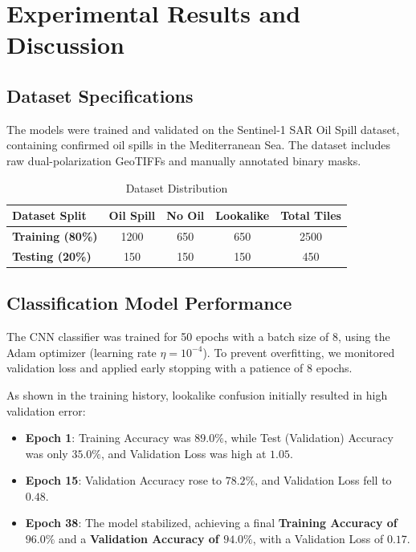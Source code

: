 \documentclass[conference]{IEEEtran}
\begin{document}
\section{Experimental Results and Discussion}

\subsection{Dataset Specifications}
The models were trained and validated on the Sentinel-1 SAR Oil Spill dataset, containing confirmed oil spills in the Mediterranean Sea. The dataset includes raw dual-polarization GeoTIFFs and manually annotated binary masks.

\begin{table}[h]
\caption{Dataset Distribution}
\label{tab:dataset}
\centering
\begin{tabular}{lcccc}
\toprule
Dataset Split & Oil Spill & No Oil & Lookalike & Total Tiles \\
\midrule
\textbf{Training (80\%)} & 1200 & 650 & 650 & 2500 \\
\textbf{Testing (20\%)} & 150 & 150 & 150 & 450 \\
\bottomrule
\end{tabular}
\end{table}

\subsection{Classification Model Performance}
The CNN classifier was trained for 50 epochs with a batch size of 8, using the Adam optimizer (learning rate $\eta = 10^{-4}$). To prevent overfitting, we monitored validation loss and applied early stopping with a patience of 8 epochs.

As shown in the training history, lookalike confusion initially resulted in high validation error:
\begin{itemize}
\item \textbf{Epoch 1}: Training Accuracy was $89.0\%$, while Test (Validation) Accuracy was only $35.0\%$, and Validation Loss was high at $1.05$.
\item \textbf{Epoch 15}: Validation Accuracy rose to $78.2\%$, and Validation Loss fell to $0.48$.
\item \textbf{Epoch 38}: The model stabilized, achieving a final \textbf{Training Accuracy of $96.0\%$} and a \textbf{Validation Accuracy of $94.0\%$}, with a Validation Loss of $0.17$.
\end{itemize}
\end{document}
